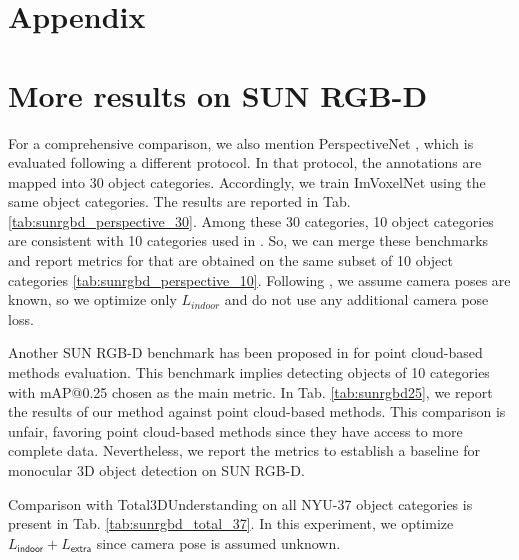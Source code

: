 \documentclass[10pt,twocolumn,letterpaper]{article}
\begin{document}
\clearpage

\begingroup
    \small
    
    
\endgroup

\clearpage

\section*{Appendix}

\appendix

\section{More results on SUN RGB-D} \label{sec:sunrgbd}

For a comprehensive comparison, we also mention PerspectiveNet \cite{huang2019perspectivenet}, which is evaluated following a different protocol. In that protocol, the annotations are mapped into 30 object categories. Accordingly, we train ImVoxelNet using the same object categories. The results are reported in Tab. \ref{tab:sunrgbd_perspective_30}. Among these 30 categories, 10 object categories are consistent with 10 categories used in \cite{huang2018holistic, huang2018cooperative, nie2020total3dunderstanding}. So, we can merge these benchmarks and report metrics for \cite{huang2018holistic, huang2018cooperative, nie2020total3dunderstanding, huang2019perspectivenet} that are obtained on the same subset of 10 object categories \ref{tab:sunrgbd_perspective_10}. Following \cite{huang2019perspectivenet}, we assume camera poses are known, so we optimize only $L_{indoor}$ and do not use any additional camera pose loss.

Another SUN RGB-D benchmark has been proposed in \cite{qi2019votenet} for point cloud-based methods evaluation. This benchmark implies detecting objects of 10 categories with mAP@0.25 chosen as the main metric. In Tab. \ref{tab:sunrgbd25}, we report the results of our method against point cloud-based methods. This comparison is unfair, favoring point cloud-based methods since they have access to more complete data. Nevertheless, we report the metrics to establish a baseline for monocular 3D object detection on SUN RGB-D.

Comparison with Total3DUnderstanding \cite{nie2020total3dunderstanding} on all NYU-37 object categories is present in Tab. \ref{tab:sunrgbd_total_37}. In this experiment, we optimize $L_\mathsf{indoor}+L_\mathsf{extra}$ since camera pose is assumed unknown.
\end{document}
